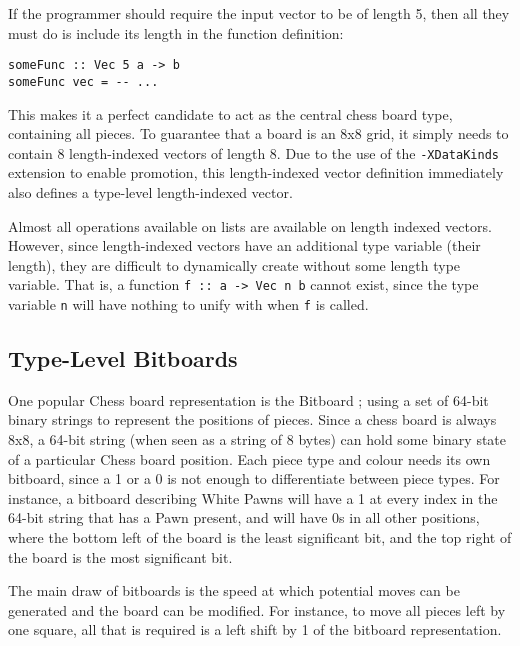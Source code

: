 \documentclass[12pt, a4paper, bibliography=totocnumbered]{scrreprt}
\newcommand{\inline}[1]{\lstinline[basicstyle=\ttfamily\footnotesize]{#1}}
\begin{document}
If the programmer should require the input vector to be of length 5, then all they must do is include its length in the function definition:

\begin{lstlisting}
someFunc :: Vec 5 a -> b
someFunc vec = -- ...
\end{lstlisting}

This makes it a perfect candidate to act as the central chess board type, containing all pieces. To guarantee that a board is an 8x8 grid, it simply needs to contain 8 length-indexed vectors of length 8. Due to the use of the \inline{-XDataKinds} extension to enable promotion, this length-indexed vector definition immediately also defines a type-level length-indexed vector.

Almost all operations available on lists are available on length indexed vectors. However, since length-indexed vectors have an additional type variable (their length), they are difficult to dynamically create without some length type variable. That is, a function \inline{f :: a -> Vec n b} cannot exist, since the type variable \inline{n} will have nothing to unify with when \inline{f} is called.

\subsection{Type-Level Bitboards}

One popular Chess board representation is the Bitboard \cite{bitboard}; using a set of 64-bit binary strings to represent the positions of pieces. Since a chess board is always 8x8, a 64-bit string (when seen as a string of 8 bytes) can hold some binary state of a particular Chess board position. Each piece type and colour needs its own bitboard, since a 1 or a 0 is not enough to differentiate between piece types. For instance, a bitboard describing White Pawns will have a 1 at every index in the 64-bit string that has a Pawn present, and will have 0s in all other positions, where the bottom left of the board is the least significant bit, and the top right of the board is the most significant bit.

The main draw of bitboards is the speed at which potential moves can be generated and the board can be modified. For instance, to move all pieces left by one square, all that is required is a left shift by 1 of the bitboard representation.
\end{document}
